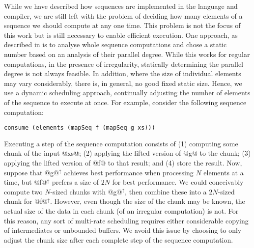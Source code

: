 While we have described how sequences are implemented in the language and compiler, we are still left with the problem of deciding how many elements of a sequence we should compute at any one time. This problem is not the focus of this work but is still necessary to enable efficient execution. One approach, as described in \citet{Madsen:2015} is to analyse whole sequence computations and chose a static number based on an analysis of their parallel
degree. While this works for regular computations, in the presence of
irregularity, statically determining the parallel degree is not always feasible. In addition, where the size of individual elements may vary considerably, there is, in general, no good fixed static size. Hence, we use a dynamic scheduling
approach, continually adjusting the number of elements of the sequence to execute
at once.
For example, consider the following sequence computation:
%
\begin{lstlisting}
consume (elements (mapSeq f (mapSeq g xs)))
\end{lstlisting}
%
Executing a step of the sequence computation consists of (1) computing some
chunk of the input @xs@; (2) applying the lifted version of @g@ to the chunk; (3) applying the lifted version of @f@ to that result; and (4) store the result. Now, suppose that @g@$^\uparrow$ achieves best performance when processing $N$ elements at a
time, but @f@$^\uparrow$ prefers a size of $2N$ for best performance. We could
conceivably compute two $N$-sized chunks with @g@$^\uparrow$, then combine these
into a $2N$-sized chunk for @f@$^\uparrow$. However, even though the size of the
chunk may be known, the actual size of the data in each chunk (of an irregular
computation) is not. For this reason, any sort of multi-rate scheduling requires
either considerable copying of intermediates or unbounded buffers. We avoid this
issue by choosing to only adjust the chunk size after each complete step of the
sequence computation.

